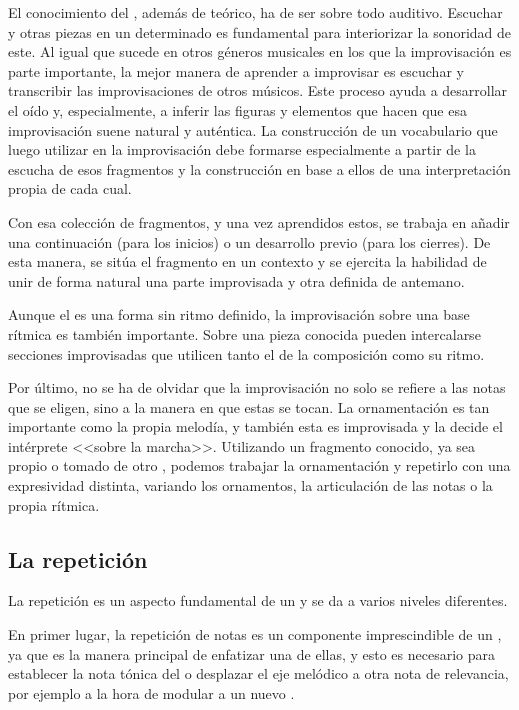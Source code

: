 El conocimiento del \maqamb, además de teórico, ha de ser sobre todo auditivo. Escuchar \taqasim y otras piezas en un determinado \maqam es fundamental para interiorizar la sonoridad de este. Al igual que sucede en otros géneros musicales en los que la improvisación es parte importante, la mejor manera de aprender a improvisar es escuchar y transcribir las improvisaciones de otros músicos. Este proceso ayuda a desarrollar el oído y, especialmente, a inferir las figuras y elementos que hacen que esa improvisación suene natural y auténtica. La construcción de un vocabulario que luego utilizar en la improvisación debe formarse especialmente a partir de la escucha de esos fragmentos y la construcción en base a ellos de una interpretación propia de cada cual.

Con esa colección de fragmentos, y una vez aprendidos estos, se trabaja en añadir una continuación (para los inicios) o un desarrollo previo (para los cierres). De esta manera, se sitúa el fragmento en un contexto y se ejercita la habilidad de unir de forma natural una parte improvisada y otra definida de antemano.

Aunque el \taqsim es una forma sin ritmo definido, la improvisación sobre una base rítmica es también importante. Sobre una pieza conocida pueden intercalarse secciones improvisadas que utilicen tanto el \maqam de la composición como su ritmo.

Por último, no se ha de olvidar que la improvisación no solo se refiere a las notas que se eligen, sino a la manera en que estas se tocan. La ornamentación es tan importante como la propia melodía, y también esta es improvisada y la decide el intérprete <<sobre la marcha>>. Utilizando un fragmento conocido, ya sea propio o tomado de otro \taqsimb, podemos trabajar la ornamentación y repetirlo con una expresividad distinta, variando los ornamentos, la articulación de las notas o la propia rítmica.

\subsection{La repetición}

La repetición es un aspecto fundamental de un \taqsim y se da a varios niveles diferentes.

En primer lugar, la repetición de notas es un componente imprescindible de un \taqsimb, ya que es la manera principal de enfatizar una de ellas, y esto es necesario para establecer la nota tónica del \maqam o desplazar el eje melódico a otra nota de relevancia, por ejemplo a la hora de modular a un nuevo \maqamb.

